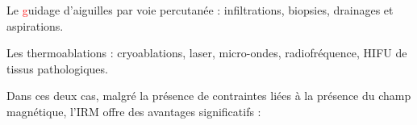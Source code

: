 \begin{description}
\item  Le \textcolor{red}{g}uidage d’aiguilles par voie percutanée : infiltrations, biopsies, drainages et aspirations.
\item Les thermoablations : cryoablations, laser, micro-ondes, radiofréquence, \ac{HIFU} de tissus pathologiques.
\end{description}


Dans ces deux cas, malgré la présence de contraintes liées à la présence du champ magnétique, l’IRM offre des avantages significatifs :\\